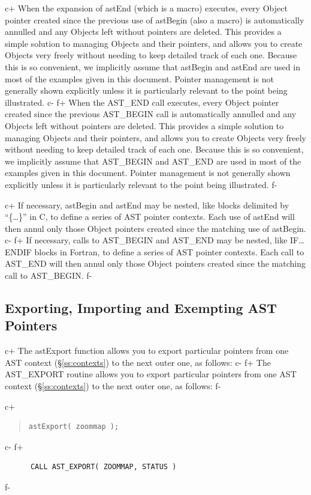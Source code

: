 \documentclass[twoside,11pt]{article}
\newcommand{\secref}[1]{\S\ref{#1}}
\newcommand{\secref}[1]{\ref{#1}}
\begin{document}
c+
When the expansion of astEnd (which is a macro) executes, every Object
pointer created since the previous use of astBegin (also a macro) is
automatically annulled and any Objects left without pointers are
deleted. This provides a simple solution to managing Objects and their
pointers, and allows you to create Objects very freely without needing
to keep detailed track of each one.  Because this is so convenient, we
implicitly assume that astBegin and astEnd are used in most of the
examples given in this document.  Pointer management is not generally
shown explicitly unless it is particularly relevant to the point being
illustrated.
c-
f+
When the AST\_END call executes, every Object pointer created since
the previous AST\_BEGIN call is automatically annulled and any Objects
left without pointers are deleted. This provides a simple solution to
managing Objects and their pointers, and allows you to create Objects
very freely without needing to keep detailed track of each one.
Because this is so convenient, we implicitly assume that AST\_BEGIN
and AST\_END are used in most of the examples given in this document.
Pointer management is not generally shown explicitly unless it is
particularly relevant to the point being illustrated.
f-

c+
If necessary, astBegin and astEnd may be nested, like blocks delimited
by ``\{\ldots\}'' in C, to define a series of AST pointer
contexts. Each use of astEnd will then annul only those Object
pointers created since the matching use of astBegin.
c-
f+
If necessary, calls to AST\_BEGIN and AST\_END may be nested, like
IF\ldots ENDIF blocks in Fortran, to define a series of AST pointer
contexts. Each call to AST\_END will then annul only those Object
pointers created since the matching call to AST\_BEGIN.
f-

\subsection{Exporting, Importing and Exempting AST Pointers}
c+
The astExport function allows you to export particular pointers from
one AST context (\secref{ss:contexts}) to the next outer one, as
follows:
c-
f+
The AST\_EXPORT routine allows you to export particular pointers from
one AST context (\secref{ss:contexts}) to the next outer one, as
follows:
f-

c+
\begin{quote}
\small
\begin{verbatim}
astExport( zoommap );
\end{verbatim}
\normalsize
\end{quote}
c-
f+
\small
\begin{verbatim}
      CALL AST_EXPORT( ZOOMMAP, STATUS )
\end{verbatim}
\normalsize
f-
\end{document}
